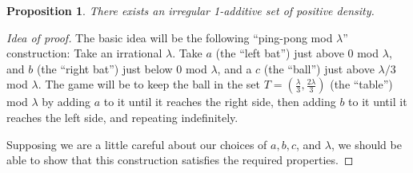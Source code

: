 \documentclass{report}
\newtheorem{proposition}[theorem]{Proposition}
\theoremstyle{remark}
\numberwithin{equation}{section}
\begin{document}
\begin{proposition}\label{prop:irr_1add}
  There exists an irregular 1-additive set of positive density.
\end{proposition}

\begin{proof}[Idea of proof]
  The basic idea will be the following ``ping-pong mod $\lambda$''
  construction: Take an irrational $\lambda$.  Take $a$ (the ``left
  bat'') just above $0$ mod $\lambda$, and $b$ (the ``right bat'')
  just below 0 mod $\lambda$, and a $c$ (the ``ball'') just above
  $\lambda/3$ mod $\lambda$.  The game will be to keep the ball in the
  set $T = (\frac{\lambda}{3}, \frac{2\lambda}{3})$ (the ``table'')
  mod $\lambda$ by adding $a$ to it until it reaches the right side,
  then adding $b$ to it until it reaches the left side, and repeating
  indefinitely.

  Supposing we are a little careful about our choices of $a, b, c$,
  and $\lambda$, we should be able to show that this construction
  satisfies the required properties.
\end{proof}
\end{document}
